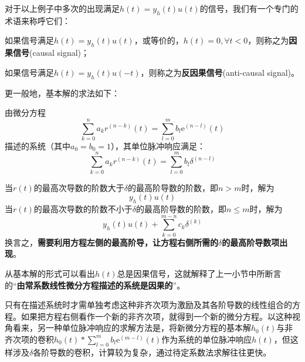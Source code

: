 对于以上例子中多次的出现满足$h(t)=y_h(t)u(t)$的信号，我们有一个专门的术语来称呼它们：

\begin{definition}
    如果信号满足$h(t)=y_h(t)u(t)$，或等价的，$h(t)=0,\forall t<0$，则称之为\textbf{因果信号}(causal signal)；
    
    如果信号满足$h(t)=y_h(t)u(-t)$，则称之为\textbf{反因果信号}(anti-causal signal)。
\end{definition}

更一般地，基本解的求法如下：
\begin{theorem}
    由微分方程
    \[\sum_{k=0}^{n}a_{k} r^{(n-k)}(t)=\sum_{l=0}^{m}b_{l} \mathrm{e}^{(n-l)}(t)\]
    描述的系统（其中$a_0=b_0=1$），其单位脉冲响应满足：
    \[\sum_{k=0}^{n}a_{k} r^{(n-k)}(t)=\sum_{l=0}^{m}b_{l} \delta^{(n-l)}\]
\end{theorem}
当$r(t)$的最高次导数的阶数大于$\delta$的最高阶导数的阶数，即$n>m$时，解为
$$y_h(t)u(t)$$
当$r(t)$的最高次导数的阶数不小于$\delta$的最高阶导数的阶数，即$n\leq m$时，解为
$$y_h(t)u(t)+\sum_{k=0}^{m-n}c_k \delta^{(k)}$$
换言之，\textbf{需要利用方程左侧的最高阶导，让方程右侧所需的$\delta$的最高阶导数项出现}。

从基本解的形式可以看出$h(t)$总是因果信号，这就解释了上一小节中所断言的“\textbf{由常系数线性微分方程描述的系统是因果的}”。

只有在描述系统时才需单独考虑这种非齐次项为激励及其各阶导数的线性组合的方程。如果把方程右侧看作一个新的非齐次项，就得到一个新的微分方程。以这种视角看来，另一种单位脉冲响应的求解方法是，将新微分方程的基本解$h_0(t)$与非齐次项的卷积$h_0(t)*\sum_{l=0}^{m}b_l \mathrm{e}^{(m-l)}(t)$作为系统的单位脉冲响应$h(t)$，但这样涉及$\delta$各阶导数的卷积，计算较为复杂，通过待定系数法求解往往更快。

